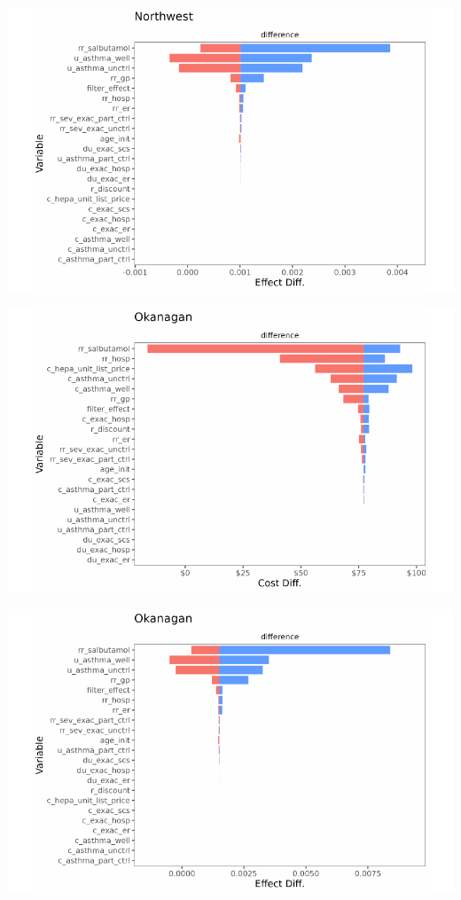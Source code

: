 \documentclass[
  number]{elsarticle}
\begin{document}
\includegraphics{index_files/figure-pdf/unnamed-chunk-9-22.pdf}

\includegraphics{index_files/figure-pdf/unnamed-chunk-9-23.pdf}

\includegraphics{index_files/figure-pdf/unnamed-chunk-9-24.pdf}
\end{document}

